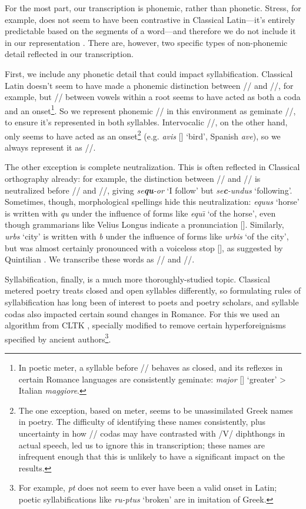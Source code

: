 \documentclass[12pt,twoside]{article}
\newcommand{\ipa}[1]{/\textipa{#1}/}
\newcommand{\ipab}[1]{[\textipa{#1}]}
\begin{document}
For the most part, our transcription is phonemic, rather than phonetic. Stress, for example, does not seem to have been contrastive in Classical Latin---it's entirely predictable based on the segments of a word---and therefore we do not include it in our representation \parencites[83]{allen}[I.5.30]{quintilian}. There are, however, two specific types of non-phonemic detail reflected in our transcription.

First, we include any phonetic detail that could impact syllabification. Classical Latin doesn't seem to have made a phonemic distinction between \ipa{j} and \ipa{jj}, for example, but \ipa{j} between vowels within a root seems to have acted as both a coda and an onset\footnote{In poetic meter, a syllable before \ipa{j} behaves as closed, and its reflexes in certain Romance languages are consistently geminate: \emph{major} \ipab{maj.jor} `greater' > Italian \emph{maggiore}.}. So we represent phonemic \ipa{j} in this environment as geminate \ipa{jj}, to ensure it's represented in both syllables. Intervocalic \ipa{w}, on the other hand, only seems to have acted as an onset\footnote{The one exception, based on meter, seems to be unassimilated Greek names in poetry. The difficulty of identifying these names consistently, plus uncertainty in how \ipa{w} codas may have contrasted with /V/ diphthongs in actual speech, led us to ignore this in transcription; these names are infrequent enough that this is unlikely to have a significant impact on the results.} (e.g. \emph{avis} \ipab{a.wis} `bird', Spanish \emph{ave}), so we always represent it as \ipa{w}.

The other exception is complete neutralization. This is often reflected in Classical orthography already: for example, the distinction between \ipa{k} and \ipa{k\super{w}} is neutralized before \ipa{u} and \ipa{u:}, giving \emph{se\textbf{qu}-or} `I follow' but \emph{se\textbf{c}-undus} `following'. Sometimes, though, morphological spellings hide this neutralization: \emph{equus} `horse' is written with \emph{qu} under the influence of forms like \emph{equ\=\i} `of the horse', even though grammarians like Velius Longus \citep[59.2-8]{longus} indicate a pronunciation \ipab{ekus}. Similarly, \emph{urbs} `city' is written with \emph{b} under the influence of forms like \emph{urbis} `of the city', but was almost certainly pronounced with a voiceless stop \ipab{urps}, as suggested by Quintilian \citep[I.7.7]{quintilian}. We transcribe these words as \ipa{ekus} and \ipa{urps}.

Syllabification, finally, is a much more thoroughly-studied topic. Classical metered poetry treats closed and open syllables differently, so formulating rules of syllabification has long been of interest to poets and poetry scholars, and syllable codas also impacted certain sound changes in Romance. For this we used an algorithm from CLTK \citep{cltk}, specially modified to remove certain hyperforeignisms specified by ancient authors\footnote{For example, \emph{pt} does not seem to ever have been a valid onset in Latin; poetic syllabifications like \emph{ru-ptus} `broken' are in imitation of Greek.}.
\end{document}

